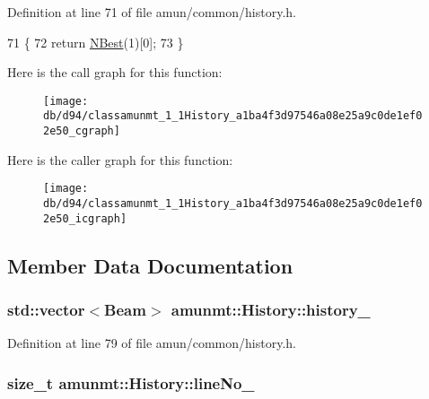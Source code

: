 Definition at line 71 of file amun/common/history.\+h.


\begin{DoxyCode}
71                        \{
72       \textcolor{keywordflow}{return} \hyperlink{classamunmt_1_1History_af982104b58a4d8cf3893d39724a120c4}{NBest}(1)[0];
73     \}
\end{DoxyCode}


Here is the call graph for this function\+:
\nopagebreak
\begin{figure}[H]
\begin{center}
\leavevmode
\texttt{[image: db/d94/classamunmt\_1\_1History\_a1ba4f3d97546a08e25a9c0de1ef02e50\_cgraph]}
\end{center}
\end{figure}




Here is the caller graph for this function\+:
\nopagebreak
\begin{figure}[H]
\begin{center}
\leavevmode
\texttt{[image: db/d94/classamunmt\_1\_1History\_a1ba4f3d97546a08e25a9c0de1ef02e50\_icgraph]}
\end{center}
\end{figure}




\subsection{Member Data Documentation}
\subsubsection[{\texorpdfstring{history\+\_\+}{history_}}]{\setlength{\rightskip}{0pt plus 5cm}std\+::vector$<${\bf Beam}$>$ amunmt\+::\+History\+::history\+\_\+\hspace{0.3cm}{\ttfamily [private]}}\hypertarget{classamunmt_1_1History_af461c82a737eb49ea7f0374082294875}{}\label{classamunmt_1_1History_af461c82a737eb49ea7f0374082294875}


Definition at line 79 of file amun/common/history.\+h.

\subsubsection[{\texorpdfstring{line\+No\+\_\+}{lineNo_}}]{\setlength{\rightskip}{0pt plus 5cm}size\+\_\+t amunmt\+::\+History\+::line\+No\+\_\+\hspace{0.3cm}{\ttfamily [private]}}\hypertarget{classamunmt_1_1History_a11989109ba68d057cce9a61560f4ab2e}{}\label{classamunmt_1_1History_a11989109ba68d057cce9a61560f4ab2e}


